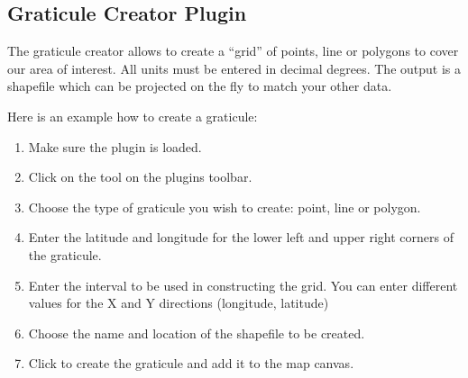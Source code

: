 
\subsection{Graticule Creator Plugin}

\updatedisclaimer

The graticule creator allows to create a ``grid'' of points, line or polygons to cover our area of interest.
All units must be entered in decimal degrees.
The output is a shapefile which can be projected on the fly to match your other data.


Here is an example how to create a graticule:

\begin{enumerate}
\item Make sure the plugin is loaded.
\item Click on the  tool on the plugins toolbar.
\item Choose the type of graticule you wish to create: point, line or polygon.
\item Enter the latitude and longitude for the lower left and upper right corners of the graticule.
\item Enter the interval to be used in constructing the grid. You can enter different values for the X and Y directions (longitude, latitude)
\item Choose the name and location of the shapefile to be created.
\item Click  to create the graticule and add it to the map canvas.
\end{enumerate} 


